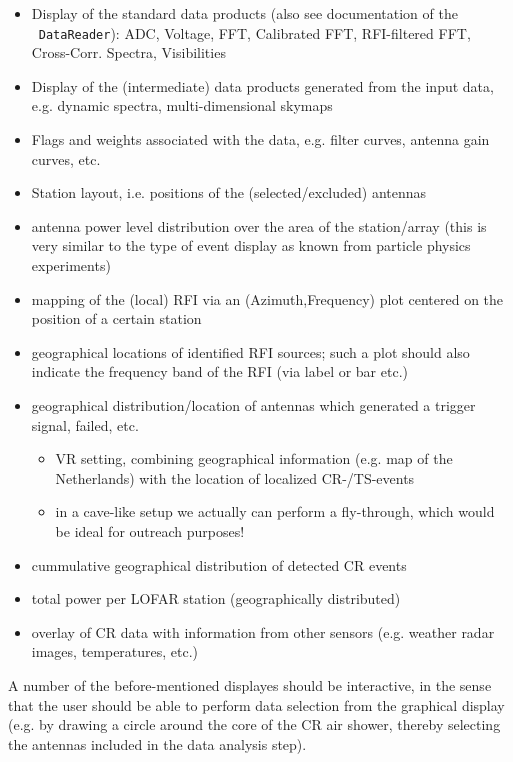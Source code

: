 \documentclass[a4paper,10pt,bibtotoc]{scrartcl}
\begin{document}
\begin{itemize}
\item Display of the standard data products (also see documentation of the
  \lopestools\ \verb|DataReader|): ADC, Voltage, FFT, Calibrated FFT,
  RFI-filtered FFT, Cross-Corr. Spectra, Visibilities
\item Display of the (intermediate) data products generated from the input
  data, e.g. dynamic spectra, multi-dimensional skymaps
\item Flags and weights associated with the data, e.g. filter curves, antenna
  gain curves, etc.
\item Station layout, i.e. positions of the (selected/excluded) antennas
\item antenna power level distribution over the area of the station/array
  (this is very similar to the type of event display as known from particle
  physics experiments)
\item mapping of the (local) RFI via an (Azimuth,Frequency) plot centered on
  the position of a certain station
\item geographical locations of identified RFI sources; such a plot should
  also indicate the  frequency band of the RFI (via label or bar etc.)
\item geographical distribution/location of antennas which generated a trigger
  signal, failed, etc.
  \begin{itemize}
  \item[$\rightarrow$] VR setting, combining geographical information (e.g.
    map of the Netherlands) with the location of localized CR-/TS-events
  \item[$\Rightarrow$] in a cave-like setup we actually can perform a
  fly-through, which would be ideal for outreach purposes!
  \end{itemize}
\item cummulative geographical distribution of detected CR events
\item total power per LOFAR station (geographically distributed)
\item overlay of CR data with information from other sensors (e.g. weather
  radar images, temperatures, etc.)
\end{itemize}
A number of the before-mentioned displayes should be interactive, in the sense
that the user should be able to perform data selection from the graphical
display (e.g. by drawing a circle around the core of the CR air shower,
thereby selecting the antennas included in the data analysis step).






\section*{\glossaryname}
\label{sec:glossary}


\end{document}
